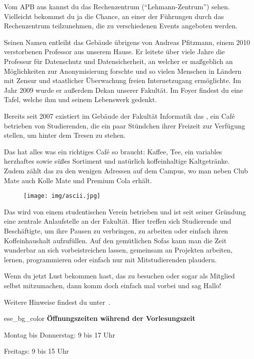 Vom APB aus kannst du das Rechenzentrum (\enquote{Lehmann-Zentrum}) sehen. Vielleicht bekommst du ja die Chance, an einer der Führungen durch das Rechenzentrum teilzunehmen, die zu verschiedenen Events angeboten werden.

Seinen Namen entleiht das Gebäude übrigens von Andreas Pfitzmann, einem 2010 verstorbenen Professor aus unserem Hause.
Er leitete über viele Jahre die Professur für Datenschutz und Datensicherheit, an welcher er maßgeblich an Möglichkeiten zur Anonymisierung forschte und so vielen Menschen in Ländern mit Zensur und staatlicher Überwachung freien Internetzugang ermöglichte. Im Jahr 2009 wurde er außerdem Dekan unserer Fakultät.
Im Foyer findest du eine Tafel, welche ihm und seinem Lebenswerk gedenkt.

\pagebreak


Bereits seit 2007 existiert im Gebäude der Fakultät Informatik das \ascii{}, ein Café betrieben von Studierenden, die ein paar Stündchen ihrer Freizeit zur Verfügung stellen, um hinter dem Tresen zu stehen.

Das \ascii{} hat alles was ein richtiges Café so braucht: Kaffee, Tee, ein variables herzhaftes sowie süßes Sortiment und natürlich koffeinhaltige Kaltgetränke.
Zudem zählt das \ascii{} zu den wenigen Adressen auf dem Campus, wo man neben Club Mate auch Kolle Mate und Premium Cola erhält.

\begin{figure}[h!]
    \centering
    \texttt{[image: img/ascii.jpg]}
\end{figure}

Das \ascii{} wird von einem studentischen Verein betrieben und ist seit seiner Gründung eine zentrale Anlaufstelle an der Fakultät.
Hier treffen sich Studierende und Beschäftigte, um ihre Pausen zu verbringen, zu arbeiten oder einfach ihren Koffeinhaushalt aufzufüllen.
Auf den gemütlichen Sofas kann man die Zeit wunderbar an sich vorbeistreichen lassen, gemeinsam an Projekten arbeiten, lernen, programmieren oder einfach nur mit Mitstudierenden plaudern.

Wenn du jetzt Lust bekommen hast, das \ascii{} zu besuchen oder sogar als Mitglied selbst mitzumachen, dann komm doch einfach mal vorbei und sag Hallo!

Weitere Hinweise findest du unter~.

\begin{awesomeblock}{2pt}{\faCalendar*[regular]}{ese_bg_color}
    \textbf{Öffnungszeiten während der Vorlesungszeit}

    Montag bis Donnerstag: 9 bis 17 Uhr

    Freitags: 9 bis 15 Uhr
\end{awesomeblock}
